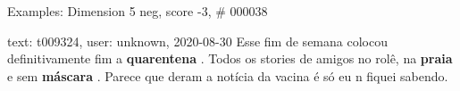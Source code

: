 \begin{frame}{Examples: Dimension 5 neg, score -3, \# 000038}
\footnotesize
\begin{alertblock}{text: t009324, user: unknown, 2020-08-30}
Esse fim de semana colocou definitivamente fim a \textbf{quarentena} . Todos os 
stories de amigos no rolê, na \textbf{praia} e sem \textbf{máscara} . Parece 
que deram a notícia da vacina é só eu n fiquei sabendo. 
\end{alertblock}
\end{frame}
